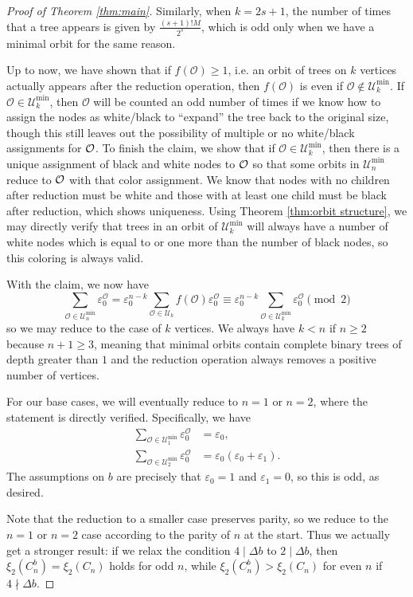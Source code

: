 \begin{proof}[Proof of Theorem \ref{thm:main}]
    Similarly, when $k=2s+1$, the number of times that a tree appears is given by $\frac{(s+1)!M}{2^s}$, which is odd only when we have a minimal orbit for the same reason.
    
    Up to now, we have shown that if $f(\mathcal{O})\geq 1$, i.e. an orbit of trees on $k$ vertices actually appears after the reduction operation, then $f(\mathcal{O})$ is even if $\mathcal{O}\not \in\mathcal{U}_k^{\text{min}}$. If $\mathcal{O}\in \mathcal{U}_k^{\text{min}}$, then $\mathcal{O}$ will be counted an odd number of times if we know how to assign the nodes as white/black to ``expand'' the tree back to the original size, though this still leaves out the possibility of multiple or no white/black assignments for $\mathcal{O}$. To finish the claim, we show that if $\mathcal{O}\in\mathcal{U}_k^{\text{min}}$, then there is a unique assignment of black and white nodes to $\mathcal{O}$ so that some orbits in $\mathcal{U}^{\text{min}}_n$ reduce to $\mathcal{O}$ with that color assignment. We know that nodes with no children after reduction must be white and those with at least one child must be black after reduction, which shows uniqueness. Using Theorem \ref{thm:orbit structure}, we may directly verify that trees in an orbit of $\mathcal{U}_k^{\text{min}}$ will always have a number of white nodes which is equal to or one more than the number of black nodes, so this coloring is always valid.
    
    With the claim, we now have
    \[\sum_{\mathcal{O}\in\mathcal{U}_n^{\text{min}}}\varepsilon^{\mathcal{O}}_0= \varepsilon_0^{n-k}\sum_{\mathcal{O}\in \mathcal{U}_k}f(\mathcal{O})\varepsilon^{\mathcal{O}}_0 \equiv\varepsilon^{n-k}_0\sum_{\mathcal{O}\in\mathcal{U}_k^{\text{min}}}\varepsilon^{\mathcal{O}}_0\pmod{2}\]
    so we may reduce to the case of $k$ vertices. We always have $k < n$ if $n\geq 2$ because $n+1\geq 3$, meaning that minimal orbits contain complete binary trees of depth greater than $1$ and the reduction operation always removes a positive number of vertices.
    
    For our base cases, we will eventually reduce to $n=1$ or $n=2$, where the statement is directly verified. Specifically, we have
    \begin{align*}
        \sum_{\mathcal{O}\in\mathcal{U}_1^{\text{min}}}\varepsilon^{\mathcal{O}}_0 &= \varepsilon_0, \\
        \sum_{\mathcal{O}\in\mathcal{U}_2^{\text{min}}}\varepsilon^{\mathcal{O}}_0 &= \varepsilon_0(\varepsilon_0+\varepsilon_1).
    \end{align*}
    The assumptions on $b$ are precisely that $\varepsilon_0=1$ and $\varepsilon_1=0$, so this is odd, as desired.
    
    Note that the reduction to a smaller case preserves parity, so we reduce to the $n=1$ or $n=2$ case according to the parity of $n$ at the start. Thus we actually get a stronger result: if we relax the condition $4\mid \Delta b$ to $2\mid \Delta b$, then $\xi_2(C^b_n)=\xi_2(C_n)$ holds for odd $n$, while $\xi_2(C^b_n) > \xi_2(C_n)$ for even $n$ if $4\nmid \Delta b$.
\end{proof}

